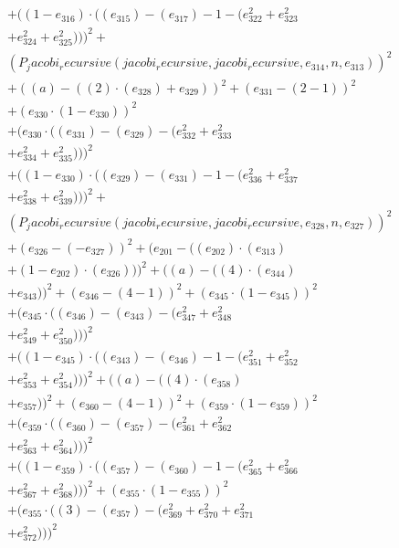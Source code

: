 \documentclass[10pt, a4paper]{article}
\begin{document}
\begin{align*}
& + ((1 - e_{316})  \cdot  ((e_{315}) - (e_{317}) - 1 - (e_{322}^{2} + e_{323}^{2} \\
& + e_{324}^{2} + e_{325}^{2})))^{2} + \\
& (P_jacobi_recursive(jacobi_recursive, jacobi_recursive, e_{314}, n, e_{313}))^{2} \\
& + ((a) - ((2)  \cdot  (e_{328}) + e_{329}))^{2} + (e_{331} - (2 - 1))^{2} \\
& + (e_{330}  \cdot  (1 - e_{330}))^{2} \\
& + (e_{330}  \cdot  ((e_{331}) - (e_{329}) - (e_{332}^{2} + e_{333}^{2} \\
& + e_{334}^{2} + e_{335}^{2})))^{2} \\
& + ((1 - e_{330})  \cdot  ((e_{329}) - (e_{331}) - 1 - (e_{336}^{2} + e_{337}^{2} \\
& + e_{338}^{2} + e_{339}^{2})))^{2} + \\
& (P_jacobi_recursive(jacobi_recursive, jacobi_recursive, e_{328}, n, e_{327}))^{2} \\
& + (e_{326} - (-e_{327}))^{2} + (e_{201} - ((e_{202})  \cdot  (e_{313}) \\
& + (1 - e_{202})  \cdot  (e_{326})))^{2} + ((a) - ((4)  \cdot  (e_{344}) \\
& + e_{343}))^{2} + (e_{346} - (4 - 1))^{2} + (e_{345}  \cdot  (1 - e_{345}))^{2} \\
& + (e_{345}  \cdot  ((e_{346}) - (e_{343}) - (e_{347}^{2} + e_{348}^{2} \\
& + e_{349}^{2} + e_{350}^{2})))^{2} \\
& + ((1 - e_{345})  \cdot  ((e_{343}) - (e_{346}) - 1 - (e_{351}^{2} + e_{352}^{2} \\
& + e_{353}^{2} + e_{354}^{2})))^{2} + ((a) - ((4)  \cdot  (e_{358}) \\
& + e_{357}))^{2} + (e_{360} - (4 - 1))^{2} + (e_{359}  \cdot  (1 - e_{359}))^{2} \\
& + (e_{359}  \cdot  ((e_{360}) - (e_{357}) - (e_{361}^{2} + e_{362}^{2} \\
& + e_{363}^{2} + e_{364}^{2})))^{2} \\
& + ((1 - e_{359})  \cdot  ((e_{357}) - (e_{360}) - 1 - (e_{365}^{2} + e_{366}^{2} \\
& + e_{367}^{2} + e_{368}^{2})))^{2} + (e_{355}  \cdot  (1 - e_{355}))^{2} \\
& + (e_{355}  \cdot  ((3) - (e_{357}) - (e_{369}^{2} + e_{370}^{2} + e_{371}^{2} \\
& + e_{372}^{2})))^{2} \\

\end{align*}
\end{document}
